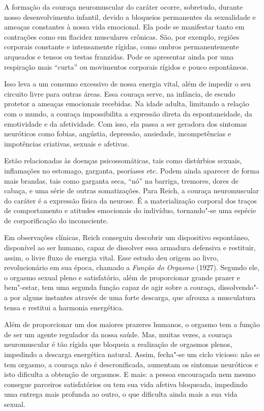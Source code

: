 A formação da couraça neuromuscular do caráter ocorre, sobretudo,
durante nosso desenvolvimento infantil, devido a bloqueios permanentes
da sexualidade e ameaças constantes à nossa vida emocional. Ela pode se
manifestar tanto em contrações como em flacidez musculares crônicas.
São, por exemplo, regiões corporais constante e intensamente rígidas,
como ombros permanentemente arqueados e tensos ou testas franzidas. Pode
se apresentar ainda por uma respiração mais ``curta'' ou movimentos
corporais rígidos e pouco espontâneos.

Isso leva a um consumo excessivo de nossa energia vital, além de impedir
o seu circuito livre para outras áreas. Essa couraça serve, na infância,
de escudo protetor a ameaças emocionais recebidas. Na idade adulta,
limitando a relação com o mundo, a couraça impossibilita a expressão
direta da espontaneidade, da emotividade e da afetividade. Com isso, ela
passa a ser geradora dos sintomas neuróticos como fobias, angústia,
depressão, ansiedade, incompetências e impotências criativas, sexuais e
afetivas.

Estão relacionadas às doenças psicossomáticas, tais como distúrbios
sexuais, inflamações no estomago, garganta, psoríases etc. Podem ainda
aparecer de forma mais brandas, tais como garganta seca, ``nó'' na
barriga, tremores, dores de cabaça, e uma série de outras somatizações.
Para Reich, a couraça neuromuscular do caráter é a expressão física da
neurose. É a materialização corporal dos traços de comportamento e
atitudes emocionais do indivíduo, tornando"-se uma espécie de
corporificação do inconsciente.

Em observações clínicas, Reich conseguiu descobrir um dispositivo
espontâneo, disponível ao ser humano, capaz de dissolver essa armadura
defensiva e restituir, assim, o livre fluxo de energia vital. Esse
estudo deu origem ao livro, revolucionário em sua época, chamado a
\emph{Função do Orgasmo} (1927). Segundo ele, o orgasmo sexual pleno e
satisfatório, além de proporcionar grande prazer e bem"-estar, tem uma
segunda função capaz de agir sobre a couraça, dissolvendo"-a por alguns
instantes através de uma forte descarga, que afrouxa a musculatura tensa
e restitui a harmonia energética.

Além de proporcionar um dos maiores prazeres humanos, o orgasmo tem a
função de ser um agente regulador da nossa saúde. Mas, muitas vezes, a
couraça neuromuscular é tão rígida que bloqueia a realização de orgasmos
plenos, impedindo a descarga energética natural. Assim, fecha"-se um
ciclo vicioso: não se tem orgasmo, a couraça não é descronificada,
aumentam os sintomas neuróticos e isto dificulta a obtenção de orgasmos.
E mais: a pessoa encouraçada nem mesmo consegue parceiros satisfatórios
ou tem sua vida afetiva bloqueada, impedindo uma entrega mais profunda
ao outro, o que dificulta ainda mais a sua vida sexual.

